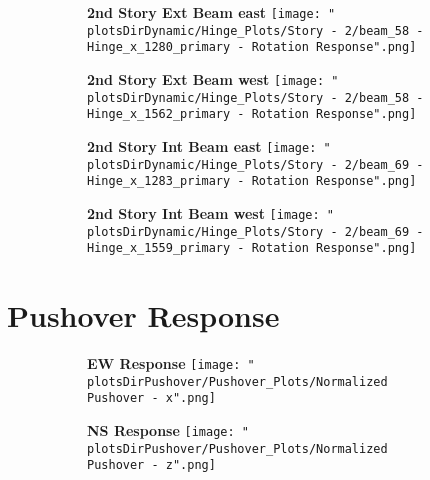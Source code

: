 \documentclass[12pt]{article} %
\begin{document}
		\begin{figure}[h]
			\centering
			\begin{subfigure}{.49\textwidth}
				\centering
				\textbf{2nd Story Ext Beam east}
				\texttt{[image: "\\plotsDirDynamic/Hinge\_Plots/Story - 2/beam\_58 - Hinge\_x\_1280\_primary - Rotation Response".png]}
			\end{subfigure}
			\begin{subfigure}{.49\textwidth}
				\centering
				\textbf{2nd Story Ext Beam west}
				\texttt{[image: "\\plotsDirDynamic/Hinge\_Plots/Story - 2/beam\_58 - Hinge\_x\_1562\_primary - Rotation Response".png]}
			\end{subfigure}
		\end{figure}
		\begin{figure}[h]
			\centering
			\begin{subfigure}{.49\textwidth}
				\centering
				\textbf{2nd Story Int Beam east}
				\texttt{[image: "\\plotsDirDynamic/Hinge\_Plots/Story - 2/beam\_69 - Hinge\_x\_1283\_primary - Rotation Response".png]}
			\end{subfigure}
			\begin{subfigure}{.49\textwidth}
				\centering
				\textbf{2nd Story Int Beam west}
				\texttt{[image: "\\plotsDirDynamic/Hinge\_Plots/Story - 2/beam\_69 - Hinge\_x\_1559\_primary - Rotation Response".png]}
			\end{subfigure}
		\end{figure}
		\pagebreak
		
	\section{Pushover Response}
	
		\begin{figure}[h]
			\centering
			\begin{subfigure}{.49\textwidth}
				\centering
				\textbf{EW Response}
				\texttt{[image: "\\plotsDirPushover/Pushover\_Plots/Normalized Pushover - x".png]}
			\end{subfigure}
			\begin{subfigure}{.49\textwidth}
				\centering
				\textbf{NS Response}
				\texttt{[image: "\\plotsDirPushover/Pushover\_Plots/Normalized Pushover - z".png]}
			\end{subfigure}
		\end{figure}
		\pagebreak
		
\end{document}
